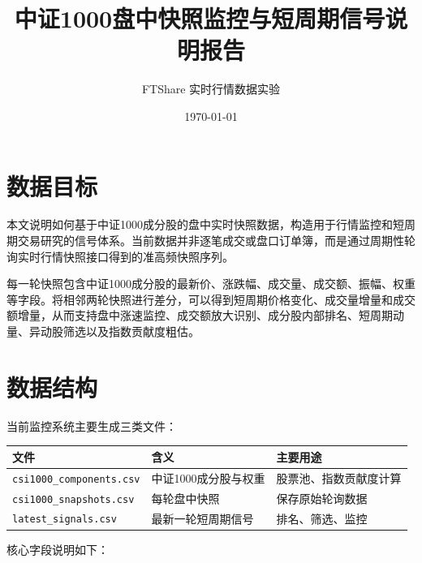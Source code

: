 \documentclass[UTF8,a4paper,12pt]{ctexart}
\title{中证1000盘中快照监控与短周期信号说明报告}
\author{FTShare 实时行情数据实验}
\date{\today}
\begin{document}
\maketitle

\section{数据目标}

本文说明如何基于中证1000成分股的盘中实时快照数据，构造用于行情监控和短周期交易研究的信号体系。当前数据并非逐笔成交或盘口订单簿，而是通过周期性轮询实时行情快照接口得到的准高频快照序列。

每一轮快照包含中证1000成分股的最新价、涨跌幅、成交量、成交额、振幅、权重等字段。将相邻两轮快照进行差分，可以得到短周期价格变化、成交量增量和成交额增量，从而支持盘中涨速监控、成交额放大识别、成分股内部排名、短周期动量、异动股筛选以及指数贡献度粗估。

\section{数据结构}

当前监控系统主要生成三类文件：

\begin{table}[h]
\centering
\begin{tabular}{lll}
\toprule
文件 & 含义 & 主要用途 \\
\midrule
\texttt{csi1000\_components.csv} & 中证1000成分股与权重 & 股票池、指数贡献度计算 \\
\texttt{csi1000\_snapshots.csv} & 每轮盘中快照 & 保存原始轮询数据 \\
\texttt{latest\_signals.csv} & 最新一轮短周期信号 & 排名、筛选、监控 \\
\bottomrule
\end{tabular}
\end{table}

核心字段说明如下：
\end{document}
